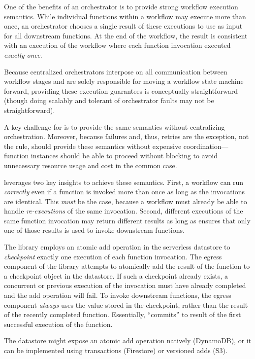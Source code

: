 One of the benefits of an orchestrator is to provide strong workflow execution
semantics. While individual functions within a workflow may execute more than
once, an orchestrator chooses a single result of these executions to use as
input for all downstream functions. At the end of the workflow, the result is
consistent with an execution of the workflow where each function invocation
executed \emph{exactly-once}.

Because centralized orchestrators interpose on all communication between
workflow stages and are solely responsible for moving a workflow state machine
forward, providing these execution guarantees is conceptually straightforward
(though doing scalably and tolerant of orchestrator faults may not be
straightforward).

A key challenge for \name{} is to provide the same semantics without
centralizing orchestration. Moreover, because failures and, thus, retries are
the exception, not the rule, \name{} should provide these semantics without
expensive coordination---function instances should be able to proceed without
blocking to avoid unnecessary resource usage and cost in the common case.

\name{} leverages two key insights to achieve these semantics. First, a workflow
can run \emph{correctly} even if a function is invoked more than once as long as
the invocations are identical. This \emph{must} be the case, because a workflow
must already be able to handle \emph{re-executions} of the same invocation.
Second, different executions of the same function invocation may return
different results as long as \name{} ensures that only one of those results is
used to invoke downstream functions.

The \name{} library employs an atomic add operation in the serverless datastore
to \emph{checkpoint} exactly one execution of each function invocation. The
egress component of the \name{} library attempts to atomically add the result of
the function to a checkpoint object in the datastore. If such a checkpoint
already exists, a concurrent or previous execution of the invocation must have
already completed and the add operation will fail. To invoke downstream
functions, the egress component \emph{always} uses the value stored in the
checkpoint, rather than the result of the recently completed function.
Essentially, \name{} ``commits'' to result of the first successful execution of
the function.

The datastore might expose an atomic add operation natively (DynamoDB), or it
can be implemented using transactions (Firestore) or versioned adds (S3).

